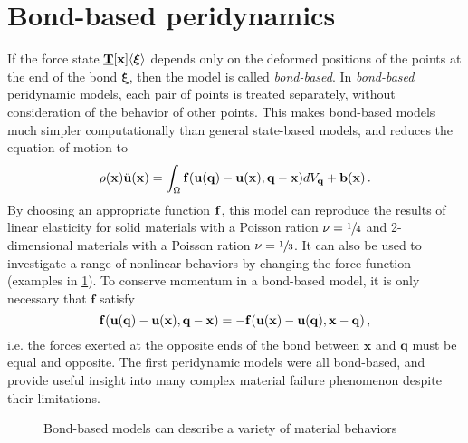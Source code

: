 \section{Bond-based peridynamics}
%
If the force state \(\vstate{T}{\mathbf{x}}{\boldsymbol{\xi}} \) depends only on the deformed positions of the points at the end of the bond $\boldsymbol{\xi}$, then the model is called \textit{bond-based}.
In \textit{bond-based} peridynamic models, each pair of points is treated separately, without consideration of the behavior of other points. 
This makes bond-based models much simpler computationally than general state-based models, and reduces the equation of motion to
%
\begin{equation}
\label{eq:PDbondEoM}
\rho(\mathbf{x})\ddot{\mathbf{u}}(\mathbf{x}) = \int_\Omega \mathit{\mathbf{f}}(\mathbf{u}(\mathbf{q})-\mathbf{u}(\mathbf{x}),\mathbf{q}-\mathbf{x}) dV_\mathbf{q}  + \mathbf{b}(\mathbf{x})\, .
\end{equation}
%
By choosing an appropriate function $\mathit{\mathbf{f}}$, this model can reproduce the results of linear elasticity for solid materials with a Poisson ration \(\nu=\sfrac{1}{4}\) and 2-dimensional materials with a Poisson ration \(\nu=\sfrac{1}{3}\). 
It can also be used to investigate a range of nonlinear behaviors by changing the force function (examples in \cref{fig:BondForce}). 
To conserve momentum in a bond-based model, it is only necessary that $\mathbf{f}$ satisfy
%
\begin{equation}
\label{eq:PDbondF}
 \mathit{\mathbf{f}}(\mathbf{u}(\mathbf{q})-\mathbf{u}(\mathbf{x}),\mathbf{q}-\mathbf{x})=-\mathit{\mathbf{f}}(\mathbf{u}(\mathbf{x})-\mathbf{u}(\mathbf{q}),\mathbf{x}-\mathbf{q})\, ,
\end{equation}
%
i.e. the forces exerted at the opposite ends of the bond between $\mathbf{x}$ and $\mathbf{q}$ must be equal and opposite.
The first peridynamic models were all bond-based, and provide useful insight into many complex material failure phenomenon despite their limitations.
%
\begin{figure}[h]
  \centering
{}
\caption{Bond-based models can describe a variety of material behaviors}
\label{fig:BondForce}
\end{figure}
%

